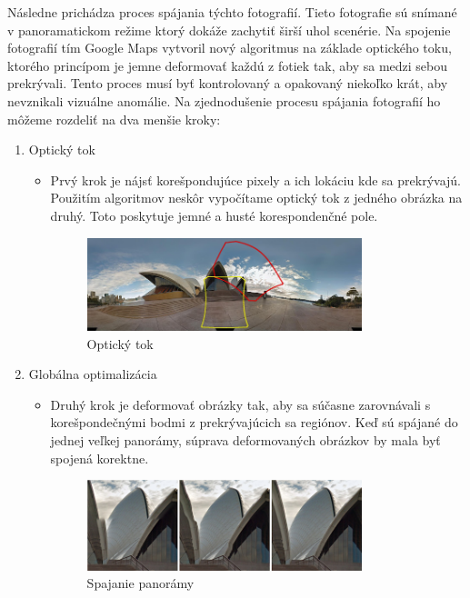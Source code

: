 \documentclass[10pt,slovak,a4paper]{article}
\begin{document}
Následne prichádza proces spájania týchto fotografií. Tieto fotografie sú snímané v panoramatickom režime ktorý dokáže zachytiť širší uhol scenérie. Na spojenie fotografií tím Google Maps vytvoril nový algoritmus na základe optického toku, ktorého princípom je jemne deformovať každú z fotiek tak, aby sa medzi sebou prekrývali. Tento proces musí byť kontrolovaný a opakovaný niekoľko krát, aby nevznikali vizuálne anomálie. Na zjednodušenie procesu spájania fotografií ho môžeme rozdeliť na dva menšie kroky:
\begin{enumerate}
\item Optický tok
\begin{itemize}
\item Prvý krok je nájsť korešpondujúce pixely a ich lokáciu kde sa prekrývajú. Použitím algoritmov neskôr vypočítame optický tok z jedného obrázka na druhý. Toto poskytuje jemné a husté korespondenčné pole.
\begin{figure}[h]
\centering
\includegraphics[width=8cm]{opticalflow.jpg}
\caption{Optický tok}
\end{figure}


\end{itemize}
\item Globálna optimalizácia
\begin{itemize}
\item
Druhý krok je deformovať obrázky tak, aby sa súčasne zarovnávali s korešpondečnými bodmi z prekrývajúcich sa regiónov. Keď sú spájané do jednej veľkej panorámy, súprava deformovaných obrázkov by mala byť spojená korektne. 
\begin{figure}[h]
\centering
\includegraphics[width=8cm]{globaloptimalization.png}
\caption{Spajanie panorámy}
\end{figure}

\end{itemize}
\end{enumerate}
\end{document}
